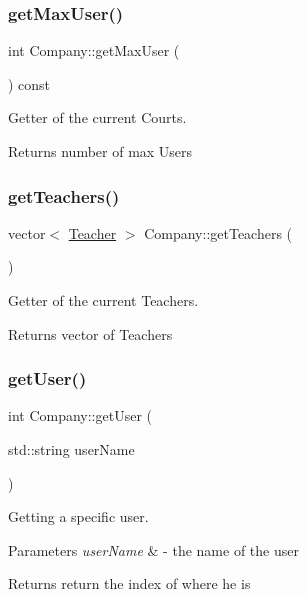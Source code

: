 \subsubsection{\texorpdfstring{get\+Max\+User()}{getMaxUser()}}
{\footnotesize\ttfamily int Company\+::get\+Max\+User (\begin{DoxyParamCaption}{ }\end{DoxyParamCaption}) const}



Getter of the current Courts. 

\begin{DoxyReturn}{Returns}
number of max Users 
\end{DoxyReturn}
\mbox{\label{class_company_a000159ce012318a6edf0335447ad8bde}} 
\subsubsection{\texorpdfstring{get\+Teachers()}{getTeachers()}}
{\footnotesize\ttfamily vector$<$ \mbox{\hyperlink{class_teacher}{Teacher}} $>$ Company\+::get\+Teachers (\begin{DoxyParamCaption}{ }\end{DoxyParamCaption})}



Getter of the current Teachers. 

\begin{DoxyReturn}{Returns}
vector of Teachers 
\end{DoxyReturn}
\mbox{\label{class_company_ad3fc4daf4b94e0156f05049eab8ff52d}} 
\subsubsection{\texorpdfstring{get\+User()}{getUser()}}
{\footnotesize\ttfamily int Company\+::get\+User (\begin{DoxyParamCaption}\item[{std\+::string}]{user\+Name }\end{DoxyParamCaption})}



Getting a specific user. 


\begin{DoxyParams}{Parameters}
{\em user\+Name} & -\/ the name of the user \\
\hline
\end{DoxyParams}
\begin{DoxyReturn}{Returns}
return the index of where he is 
\end{DoxyReturn}
\mbox{\label{class_company_a6f6a3dbf24278f5e1395d123d5812f33}} 

